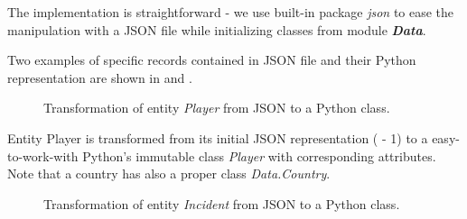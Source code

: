 The implementation is straightforward - we use built-in package \emph{json} to ease the manipulation with a JSON file while initializing classes from module \textbf{\textit{Data}}. 

Two examples of specific records contained in JSON file and their Python representation are shown in  and . 

\begin{figure}[h]
	\caption{Transformation of entity \emph{Player} from JSON to a Python class.}
	\label{fig:player}
\end{figure}

Entity {Player} is transformed from its initial JSON representation ( - 1) to a easy-to-work-with Python's immutable class \emph{Player} with corresponding attributes. Note that a country has also a proper class \emph{Data.Country}.

\begin{figure}[h]
	\caption{Transformation of entity \emph{Incident} from JSON to a Python class.}
	\label{fig:incident}
\end{figure} 

